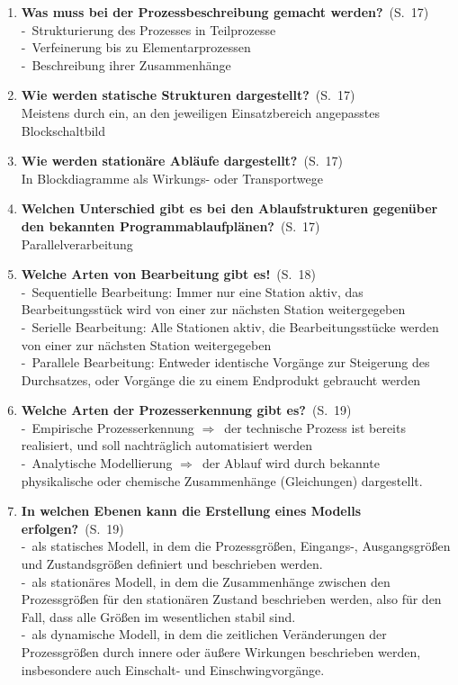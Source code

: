 \documentclass[a4paper,12pt]{article}
\newcommand{\question}[3]{\pagebreak[3]\item {\textbf{#1?}}\ (S.\ #2)#3}
\newcommand{\statement}[3]{\pagebreak[3]\item {\textbf{#1!}}\ (S.\ #2)#3}
\newcommand{\catchword}[1]{\\-\ #1}
\newcommand{\normaltext}[1]{\\#1}
\newcommand{\resultol}[1]{$\Rightarrow$\ #1}
\newcommand{\page}[1]{#1}
\begin{document}
\begin{enumerate}
  \question{Was muss bei der Prozessbeschreibung gemacht werden}{\page{17}}
  {
    \catchword{Strukturierung des Prozesses in Teilprozesse}
    \catchword{Verfeinerung bis zu Elementarprozessen}
    \catchword{Beschreibung ihrer Zusammenhänge}
  }

  \question{Wie werden statische Strukturen dargestellt}{\page{17}}
  {
    \normaltext{Meistens durch ein, an den jeweiligen Einsatzbereich angepasstes Blockschaltbild}
  }

  \question{Wie werden stationäre Abläufe dargestellt}{\page{17}}
  {
    \normaltext{In Blockdiagramme als Wirkungs- oder Transportwege}
  }

  \question{Welchen Unterschied gibt es bei den Ablaufstrukturen gegenüber
            den bekannten Programmablaufplänen}{\page{17}}
  {
    \normaltext{Parallelverarbeitung}
  }

  \statement{Welche Arten von Bearbeitung gibt es}{\page{18}}
  {
    \catchword{Sequentielle Bearbeitung: Immer nur eine Station aktiv, das Bearbeitungsstück wird
               von einer zur nächsten Station weitergegeben}
    \catchword{Serielle Bearbeitung: Alle Stationen aktiv, die Bearbeitungsstücke werden von einer
               zur nächsten Station weitergegeben}
    \catchword{Parallele Bearbeitung: Entweder identische Vorgänge zur Steigerung des Durchsatzes,
               oder Vorgänge die zu einem Endprodukt gebraucht werden}
  }

  \question{Welche Arten der Prozesserkennung gibt es}{\page{19}}
  {
    \catchword{Empirische Prozesserkennung \resultol der technische Prozess ist bereits realisiert, und soll 
               nachträglich automatisiert werden}
    \catchword{Analytische Modellierung \resultol der Ablauf wird durch bekannte physikalische oder chemische
               Zusammenhänge (Gleichungen) dargestellt. }
  }

  \question{In welchen Ebenen kann die Erstellung eines Modells erfolgen}{\page{19}}
  {
    \catchword{als statisches Modell, in dem die Prozessgrößen, Eingangs-, Ausgangsgrößen und Zustandsgrößen
               definiert und beschrieben werden.}
    \catchword{als stationäres Modell, in dem die Zusammenhänge zwischen den Prozessgrößen für den stationären 
               Zustand beschrieben werden, also für den Fall, dass alle Größen im wesentlichen stabil sind.}
    \catchword{als dynamische Modell, in dem die zeitlichen Veränderungen der Prozessgrößen durch
               innere oder äußere Wirkungen beschrieben werden, insbesondere auch Einschalt- 
               und Einschwingvorgänge.}
  }


\end{enumerate}
\end{document}
